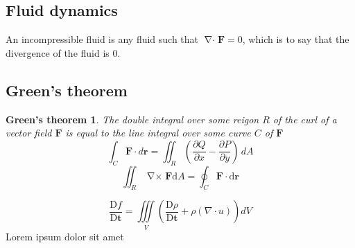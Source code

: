 \documentclass[a4paper, 12pt]{article} %
\newcommand{\fatf}{\mathbf{F}} %
\newcommand{\materialder}[2]{\frac{\mathrm{D} #1}{\mathrm{D} #2}} %
\DeclareMathOperator{\divergence}{\nabla\cdot} %
\DeclareMathOperator{\curl}{\nabla\times} %
\newtheorem{greenstheorem}{Green's theorem}
\begin{document}
\subsection{Fluid dynamics}
An incompressible fluid is any fluid such that $\divergence\fatf=0$, which is to say that the divergence of the fluid is 0.

\subsection{Green's theorem}\label{sec:greenstheorem}
\begin{greenstheorem}
	The double integral over some reigon $R$ of the curl of a vector field $\fatf$ is equal to the line integral over some curve $C$ of $\fatf$
	$$\int_C \mathbf{F} \cdot d\mathbf{r} = \iint_R \left( \frac{\partial Q}{\partial x} - \frac{\partial P}{\partial y} \right) \, dA$$
	$$\iint_R\curl\fatf\mathrm{d}A=\oint_C\fatf\cdot\mathrm{d}\mathbf{r}$$
\end{greenstheorem}
\begin{equation} %
	\materialder{f}{\mathbf{t}}=\iiint\limits_{V}(\materialder{\rho}{\mathbf{t}}+\rho(\nabla\cdot u))dV
\end{equation}
Lorem ipsum dolor sit amet \cite{peyret2012computational}

\newpage


\listoffigures
\end{document}
